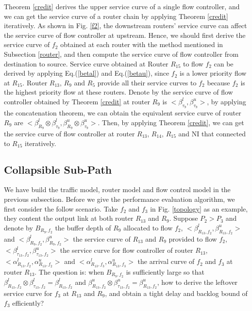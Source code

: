 \documentclass[10pt,journal]{IEEEtran}
\begin{document}
Theorem \ref{credit} derives the upper service curve of a single flow controller, and we can get the service curve of a router chain by applying Theorem
\ref{credit} iteratively. As shown in Fig. \ref{f2}, the downstream routers' service curve can affect the service curve of flow controller at upstream. Hence, we should first derive the service curve of $f_2$ obtained at each router with the method mentioned in Subsection \ref{router}, and then compute the service curve of flow controller from destination to source. Service curve obtained at Router $R_{15}$ to flow $f_2$ can be derived by applying Eq.(\ref{betal}) and Eq.(\ref{betau}), since $f_2$ is a lower priority flow at $R_{15}$. Router $R_{13}$, $R_{9}$ and $R_{5}$ provide all their service curves to $f_2$ because $f_2$ is the highest priority flow at these routers. Denote by the service curve of flow controller obtained by Theorem \ref{credit} at router $R_{9}$ is $<\beta_{\tau_9}^l,\beta_{\tau_9}^u>$, by applying the concatenation theorem, we can obtain the equivalent service curve of router $R_{9}$ are $<\beta_{R_9}^l\otimes\beta_{\tau_9}^l,\beta_{R_9}^u\otimes\beta_{\tau_9}^u>$. Then, by applying Theorem \ref{credit}, we can get the service curve of flow controller at router $R_{13}$, $R_{14}$, $R_{15}$ and NI that connected to $R_{15}$ iteratively.

\subsection{Collapsible Sub-Path}
We have build the traffic model, router model and flow control model in the previous subsection. Before we give the performance evaluation algorithm, we first consider the follow scenario. Take $f_2$ and $f_3$ in Fig. \ref{topology} as an example, they content the output link at both router $R_{13}$ and $R_{9}$. Suppose $P_2>P_3$ and denote by $B_{R_9,f_2}$ the buffer depth of $R_{9}$ allocated to flow $f_2$, $<\beta_{R_{13},f_2}^l,\beta_{R_{13},f_2}^u>$ and $<\beta_{R_{9},f_2}^l,\beta_{R_{9},f_2}^u>$ the service curve of $R_{13}$ and $R_{9}$ provided to flow $f_2$, $<\beta_{\tau_{13},f_2}^l,\beta_{\tau_{13},f_2}^u>$ the service curve for flow controller of router $R_{13}$, $<\alpha_{R_{13},f_2}^l,\alpha_{R_{13},f_2}^u>$ and $<\alpha_{R_{13},f_3}^l,\alpha_{R_{13},f_3}^u>$ the arrival curve of $f_2$ and $f_3$ at router $R_{13}$. The question is: when $B_{R_9,f_2}$ is sufficiently large so that $\beta_{R_{13},f_2}^l\otimes\beta_{\tau_{13},f_2}^l=\beta_{R_{13},f_2}^l$ and $\beta_{R_{13},f_2}^u\otimes\beta_{\tau_{13},f_2}^u=\beta_{R_{13},f_2}^u$, how to derive the leftover service curve for $f_3$ at $R_{13}$ and $R_9$, and obtain a tight delay and backlog bound of $f_3$ efficiently?
\end{document}
